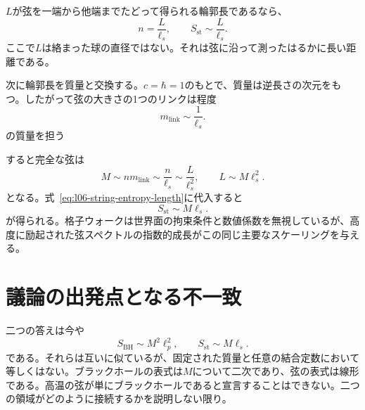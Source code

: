 \(L\)が弦を一端から他端までたどって得られる輪郭長であるなら、
\begin{equation}
n=\frac{L}{\ell_s},
\qquad
S_{\mathrm{st}}\sim\frac{L}{\ell_s}.
\label{eq:l06-string-entropy-length}
\end{equation}
ここで\(L\)は絡まった球の直径ではない。それは弦に沿って測ったはるかに長い距離である。

次に輪郭長を質量と交換する。\(c=\hbar=1\)のもとで、質量は逆長さの次元をもつ。したがって弦の大きさの1つのリンクは程度
\begin{equation}
m_{\mathrm{link}}\sim\frac{1}{\ell_s}.
\label{eq:l06-link-mass}
\end{equation}
の質量を担う

\begin{classroomqa}
\end{classroomqa}

すると完全な弦は
\begin{equation}
M\sim n m_{\mathrm{link}}
\sim\frac{n}{\ell_s}
\sim\frac{L}{\ell_s^2},
\qquad
L\sim M\ell_s^2.
\label{eq:l06-string-mass}
\end{equation}
となる。式~\eqref{eq:l06-string-entropy-length}に代入すると
\begin{equation}
S_{\mathrm{st}}\sim M\ell_s.
\label{eq:l06-string-entropy-mass}
\end{equation}
が得られる。格子ウォークは世界面の拘束条件と数値係数を無視しているが、高度に励起された弦スペクトルの指数的成長がこの同じ主要なスケーリングを与える。

\section{議論の出発点となる不一致}

二つの答えは今や
\begin{equation}
S_{\mathrm{BH}}\sim M^2\ell_p^2,
\qquad
S_{\mathrm{st}}\sim M\ell_s.
\label{eq:l06-two-entropies}
\end{equation}
である。それらは互いに似ているが、固定された質量と任意の結合定数において等しくはない。ブラックホールの表式は\(M\)について二次であり、弦の表式は線形である。高温の弦が単にブラックホールであると宣言することはできない。二つの領域がどのように接続するかを説明しない限り。

